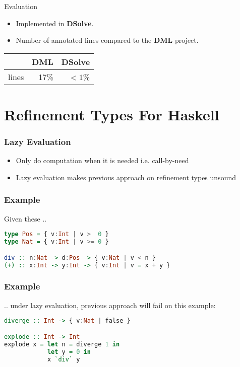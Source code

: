 \documentclass[pdf]{beamer}
\begin{document}
\begin{frame}{Evaluation}
  \begin{itemize}
    \item Implemented in \textbf{DSolve}.
    \item Number of annotated lines compared to the \textbf{DML} project.
  \end{itemize}
  \begin{table}
    \begin{tabular}{l|r|r}
            & \textbf{DML} & \textbf{DSolve}\\
      \hline
      lines & 17\%         & $< 1$\%
    \end{tabular}
  \end{table}
\end{frame}

\section{Refinement Types For Haskell}

\begin{frame}
  \frametitle{Lazy Evaluation}
  \begin{itemize}
    \item Only do computation when it is needed i.e. call-by-need
    \item Lazy evaluation makes previous approach on refinement types unsound
  \end{itemize}
\end{frame}

\begin{frame}[fragile]
  \frametitle{Example}
  Given these ..
  \begin{lstlisting}[language=haskell]
type Pos = { v:Int | v >  0 }
type Nat = { v:Int | v >= 0 }

div :: n:Nat -> d:Pos -> { v:Nat | v < n } 
(+) :: x:Int -> y:Int -> { v:Int | v = x + y }
  \end{lstlisting}
\end{frame}

\begin{frame}[fragile]
  \frametitle{Example}
  .. under lazy evaluation, previous approach will fail on this example:
  \begin{lstlisting}[language=haskell]
diverge :: Int -> { v:Nat | false } 

explode :: Int -> Int
explode x = let n = diverge 1 in 
            let y = 0 in 
            x `div` y
  \end{lstlisting}
\end{frame}
\end{document}

